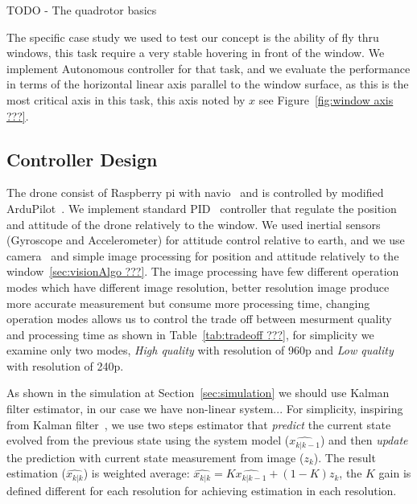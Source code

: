 \documentclass{sig-alternate-ipsn13}
\begin{document}
TODO - The quadrotor basics

The specific case study we used to test our concept is the ability of fly thru windows, this task require a very stable hovering in front of the window.
We implement Autonomous controller for that task, and we evaluate the performance in terms of the horizontal linear axis parallel to the window surface, as this is the most critical axis in this task, this axis noted by $x$ see Figure~\ref{fig:window axis ???}.

\subsection{Controller Design}
The drone consist of Raspberry pi with navio~\cite{??? raspberry, navio} and is controlled by modified ArduPilot~\cite{??? APM}.
We implement standard PID~\cite{??? PID} controller that regulate the position and attitude of the drone relatively to the window.
We used inertial sensors (Gyroscope and Accelerometer) for attitude control relative to earth, and we use camera~\cite{??? picam} and simple image processing for position and attitude relatively to the window~\ref{sec:visionAlgo ???}.
The image processing have few different operation modes which have different image resolution, better resolution image produce more accurate measurement but consume more processing time, changing operation modes allows us to control the trade off between mesurment quality and processing time as shown in Table~\ref{tab:tradeoff ???}, for simplicity we examine only two modes, \textit{High quality} with resolution of 960p and \textit{Low quality} with resolution of 240p.

As shown in the simulation at Section~\ref{sec:simulation} we should use Kalman filter estimator, in our case we have non-linear system... %
For simplicity, inspiring from Kalman filter~\cite{??? kalman}, we use two steps estimator that \textit{predict} the current state evolved from the previous state using the system model ($\hat{x_{k|k-1}}$) and then \textit{update} the prediction with current state measurement from image ($z_k$).
The result estimation ($\hat{x_{k|k}}$) is weighted average: 
$ \hat{x_{k|k}} = K \hat{x_{k|k-1}} + (1-K) z_k $, 
the $K$ gain is defined different for each resolution for achieving estimation in each resolution.
\end{document}
